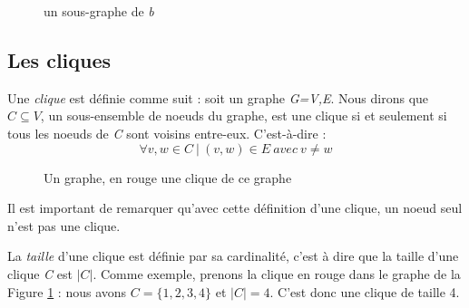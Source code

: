 \documentclass[12pt,a4paper]{article}
\begin{document}
\begin{figure}
  \centering
  \caption{un sous-graphe de \textit{b}}
\end{figure}

\subsection{Les cliques}%
\label{subsec:cliques}

Une \textit{clique} est définie comme suit :
soit un graphe \emph{G=V,E}. Nous dirons que \(C \subseteq V\), un sous-ensemble de noeuds du graphe, est une clique si et seulement si tous les noeuds de \emph{C} sont voisins entre-eux.
C'est-à-dire :
\begin{equation}\label{clique}
\forall v, w \in C \ | \ (v, w)\in E \ avec\  v \neq w
\end{equation}

\begin{figure}[h]
  \centering
  \caption{Un graphe, en rouge une clique de ce graphe}
  \label{fig:x clique1}
\end{figure}

Il est important de remarquer qu'avec cette définition d'une clique, un noeud seul n'est pas une clique.

La \textit{taille} d'une clique est définie par sa cardinalité, c'est à dire que la taille d'une clique \emph{C} est \(|C|\). Comme exemple, prenons la clique en rouge dans le graphe de la Figure \ref{fig:x clique1} : nous avons \(C = \{1,2,3,4\}\) et \(|C| = 4\). C'est donc une clique de taille 4.
\end{document}
